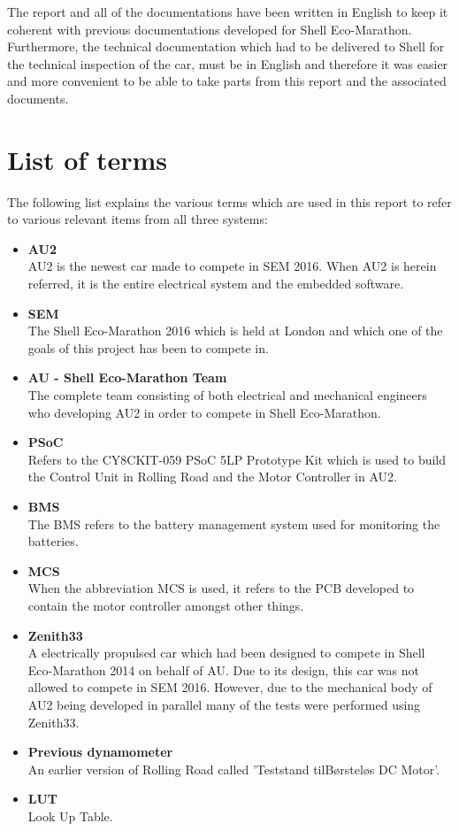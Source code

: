 The report and all of the documentations have been written in English to keep it coherent with previous documentations developed for Shell Eco-Marathon. Furthermore, the technical documentation which had to be delivered to Shell for the technical inspection of the car, must be in English and therefore it was easier and more convenient to be able to take parts from this report and the associated documents.

\section{List of terms}
The following list explains the various terms which are used in this report to refer to various relevant items from all three systems:
\begin{itemize}
	\item \textbf{AU2}\\
	AU2 is the newest car made to compete in SEM 2016. When AU2 is herein referred, it is the entire electrical system and the embedded software. 
	\item \textbf{SEM}\\
	The Shell Eco-Marathon 2016 which is held at London and which one of the goals of this project has been to compete in.
	\item \textbf{AU - Shell Eco-Marathon Team}\\
	The complete team consisting of both electrical and mechanical engineers who developing AU2 in order to compete in Shell Eco-Marathon.
	\item \textbf{PSoC}\\
	Refers to the CY8CKIT-059 PSoC 5LP Prototype Kit which is used to build the Control Unit in Rolling Road and the Motor Controller in AU2.
	\item \textbf{BMS}\\
	The BMS refers to the battery management system used for monitoring the batteries. 
	\item \textbf{MCS}\\
	When the abbreviation MCS is used, it refers to the PCB developed to contain the motor controller amongst other things.
	\item \textbf{Zenith33}\\
	A electrically propulsed car which had been designed to compete in Shell Eco-Marathon 2014\cite{BAC_zenith33} on behalf of AU. Due to its design, this car was not allowed to compete in SEM 2016. However, due to the mechanical body of AU2 being developed in parallel many of the tests were performed using Zenith33.
	\item \textbf{Previous dynamometer}\\
	An earlier version of Rolling Road called 'Teststand tilBørsteløs DC Motor'\cite{BAC_rullefelt}. 
	\item \textbf{LUT}\\
	Look Up Table. 
\end{itemize}

